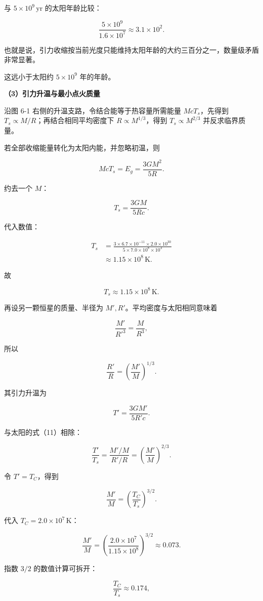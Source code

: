 \documentclass[12pt,a4paper,UTF8]{ctexart}
\begin{document}
与 \(5\times10^9\,\mathrm{yr}\) 的太阳年龄比较：

\[\frac{5\times10^9}{1.6\times10^7}\approx3.1\times10^2.\]

也就是说，引力收缩按当前光度只能维持太阳年龄的大约三百分之一，数量级矛盾非常显著。

这远小于太阳约 \(5\times10^9\) 年的年龄。

\textbf{（3）引力升温与最小点火质量}

沿图 6-1 右侧的升温支路，令结合能等于热容量所需能量 \(McT_s\)，先得到
\(T_s\propto M/R\)；再结合相同平均密度下 \(R\propto M^{1/3}\)，得到
\(T_s\propto M^{2/3}\) 并反求临界质量。

若全部收缩能量转化为太阳内能，并忽略初温，则

\[McT_s=E_g=\frac{3GM^2}{5R}.\]

约去一个 \(M\)：

\[T_s=\frac{3GM}{5Rc}. \tag{11}\]

代入数值：

\[\begin{aligned}
T_s
&=\frac{3\times6.7\times10^{-11}\times2.0\times10^{30}}
{5\times7.0\times10^8\times10^3}\\
&\approx1.15\times10^8\,\mathrm K.
\end{aligned}\]

故

\[\boxed{T_s\approx1.15\times10^8\,\mathrm K}. \tag{12}\]

再设另一颗恒星的质量、半径为 \(M',R'\)。平均密度与太阳相同意味着

\[\frac{M'}{R'^3}=\frac{M}{R^3},\]

所以

\[\frac{R'}{R}=\left(\frac{M'}{M}\right)^{1/3}. \tag{13}\]

其引力升温为

\[T' =\frac{3GM'}{5R'c}.\]

与太阳的式（11）相除：

\[\frac{T'}{T_s}
=\frac{M'/M}{R'/R}
=\left(\frac{M'}{M}\right)^{2/3}. \tag{14}\]

令 \(T'=T_C\)，得到

\[\frac{M'}{M}=\left(\frac{T_C}{T_s}\right)^{3/2}. \tag{15}\]

代入 \(T_C=2.0\times10^7\,\mathrm K\)：

\[\frac{M'}{M}
=\left(\frac{2.0\times10^7}{1.15\times10^8}\right)^{3/2}
\approx0.073. \tag{16}\]

指数 \(3/2\) 的数值计算可拆开：

\[\frac{T_C}{T_s}\approx0.174,\]
\end{document}
